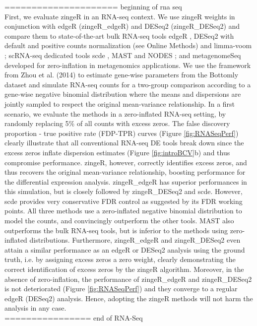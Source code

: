 \documentclass{bmcart}
\begin{document}
===================== beginning of rna seq\\
First, we evaluate zingeR in an RNA-seq context. We use zingeR weights in conjunction with edgeR (zingeR\_edgeR) and DESeq2 (zingeR\_DESeq2) and compare them to state-of-the-art bulk RNA-seq tools edgeR \cite{Robinson2010a,McCarthy2012}, DESeq2 \cite{Love2014} with default and positive counts normalization (see Online Methods) and limma-voom \cite{Law2014}; scRNA-seq dedicated tools scde \cite{Kharchenko2014}, MAST \cite{Finak2015} and NODES \cite{Sengupta2016}; and metagenomeSeq \cite{Paulson2013} developed for zero-inflation in metagenomics applications.
We use the framework from Zhou et al. (2014) \cite{Zhou2014} to estimate gene-wise parameters from the Bottomly dataset \cite{Bottomly2011} and simulate RNA-seq counts for a two-group comparison according to a gene-wise negative binomial distribution where the means and dispersions are jointly sampled to respect the original mean-variance relationship.
In a first scenario, we evaluate the methods in a zero-inflated RNA-seq setting, by randomly replacing 5\% of all counts with excess zeros.
The false discovery proportion - true positive rate (FDP-TPR) curves (Figure \ref{fig:RNASeqPerf}) clearly illustrate that all conventional RNA-seq DE tools break down since the excess zeros inflate dispersion estimates (Figure \ref{fig:introBCV}b) and thus compromise performance.
zingeR, however, correctly identifies excess zeros, and thus recovers the original mean-variance relationship, boosting performance for the differential expression analysis.
zingeR\_edgeR has superior performances in this simulation, but is closely followed by zingeR\_DESeq2 and scde.
However, scde provides very conservative FDR control as suggested by its FDR working points.
All three methods use a zero-inflated negative binomial distribution to model the counts, and convincingly outperform the other tools.
MAST also outperforms the bulk RNA-seq tools, but is inferior to the methods using zero-inflated distributions.
Furthermore, zingeR\_edgeR and zingeR\_DESeq2 even attain a similar performance as an edgeR or DESeq2 analysis using the ground truth, i.e. by assigning excess zeros a zero weight, clearly demonstrating the correct identification of excess zeros by the zingeR algorithm.
Moreover, in the absence of zero-inflation, the performance of zingeR\_edgeR and zingeR\_DESeq2 is not deteriorated (Figure \ref{fig:RNASeqPerf}) and they converge to a regular edgeR (DESeq2) analysis.
Hence, adopting the zingeR methods will not harm the analysis in any case.\\
================ end of RNA-Seq\\
\end{document}
